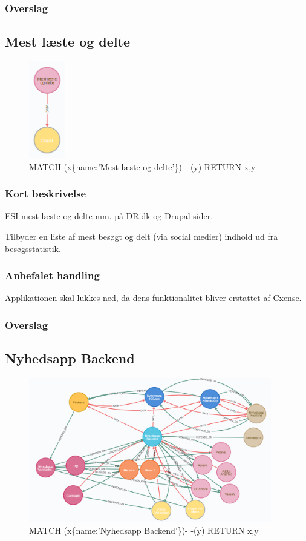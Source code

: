 \documentclass{article}
\begin{document}
\subsubsection{Overslag}


\subsection{Mest læste og delte}
\begin{figure}[h]
\includegraphics[height=120pt]{MestL.PNG}
\caption{MATCH (x\{name:'Mest læste og delte'\})- -(y) RETURN x,y}
\end{figure}
\subsubsection{Kort beskrivelse}
ESI mest læste og delte mm. på DR.dk og Drupal sider.

Tilbyder en liste af mest besøgt og delt (via social medier) indhold ud fra besøgsstatistik.
\subsubsection{Anbefalet handling}
Applikationen skal lukkes ned, da dens funktionalitet bliver erstattet af Cxense.
\subsubsection{Overslag}


\subsection{Nyhedsapp Backend}
\begin{figure}[h]
\includegraphics[width=300pt]{NyhedsappBE.PNG}
\caption{MATCH (x\{name:'Nyhedsapp Backend'\})- -(y) RETURN x,y}
\end{figure}
\end{document}
